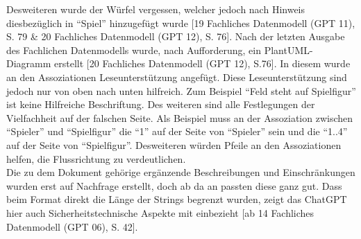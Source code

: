 Desweiteren wurde der Würfel vergessen, welcher 
jedoch nach Hinweis diesbezüglich in ``Spiel'' hinzugefügt wurde [19 Fachliches Datenmodell (GPT 11), S. 79 \& 20 Fachliches Datenmodell (GPT 12), S. 76]. 
Nach der letzten Ausgabe des Fachlichen Datenmodells wurde, nach Aufforderung, ein PlantUML-Diagramm 
erstellt [20 Fachliches Datenmodell (GPT 12), S.76]. In diesem wurde an den Assoziationen Leseunterstützung angefügt. Diese Leseunterstützung sind jedoch nur von oben nach unten hilfreich. Zum Beispiel ``Feld 
steht auf Spielfigur'' ist keine Hilfreiche Beschriftung. Des weiteren sind alle Festlegungen der Vielfachheit auf der falschen Seite. Als Beispiel muss an der 
Assoziation zwischen ``Spieler'' und ``Spielfigur'' die ``1'' auf der Seite von ``Spieler'' sein und die ``1..4'' auf der Seite von ``Spielfigur''. Desweiteren würden 
Pfeile an den Assoziationen helfen, die Flussrichtung zu verdeutlichen.\\
Die zu dem Dokument gehörige ergänzende Beschreibungen und Einschränkungen wurden erst auf Nachfrage erstellt, doch ab da an passten diese ganz gut. Dass beim 
Format direkt die Länge der Strings begrenzt wurden, zeigt das ChatGPT hier auch Sicherheitstechnische Aspekte mit einbezieht 
[ab 14 Fachliches Datenmodell (GPT 06), S. 42].\\

